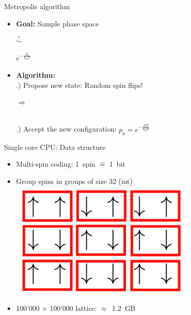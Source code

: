 \documentclass{beamer}
\begin{document}
\begin{frame}{Metropolis algorithm}
\begin{itemize}
    \item \textbf{Goal:} Sample phase space\\
        \vspace{3mm}
        \begin{minipage}[c]{0.4\textwidth}
            
        \end{minipage}
        \begin{minipage}[c]{0.2\textwidth} {\Huge $\stackrel{!}{\sim}$} \end{minipage}
        \begin{minipage}[c]{0.3\textwidth} {\Huge $e^{-\frac{E}{k_B T}}$} \end{minipage} \pause
    \vspace{2mm}
    \item \textbf{Algorithm:}\\ .) Propose new state: Random spin flips!\\
            \vspace{2mm}
            \begin{minipage}{0.3\textwidth}
                
            \end{minipage}
            \hfill
            \begin{minipage}[c]{0.2\textwidth} {\Huge $\Rightarrow$} \end{minipage}
            \begin{minipage}[c]{0.3\textwidth}
                
            \end{minipage}\\ .) Accept the new configuration: $p_a = e^{-\frac{\Delta E}{k_B T}}$
\end{itemize}
\end{frame}

\begin{frame}{Single core CPU: Data structure}
\begin{itemize}
    \item Multi-spin coding: 1~spin $\mathrel{\widehat{=}}$ 1~bit \pause
    \item Group spins in groups of size 32 (int)\\
        \includegraphics[keepaspectratio=true, width=0.7\textwidth]{images/grouped_spins_modified.png} \pause
    \item 100'000 $\times$ 100'000 lattice: $\approx$~1.2~GB
\end{itemize}
\end{frame}
\end{document}
